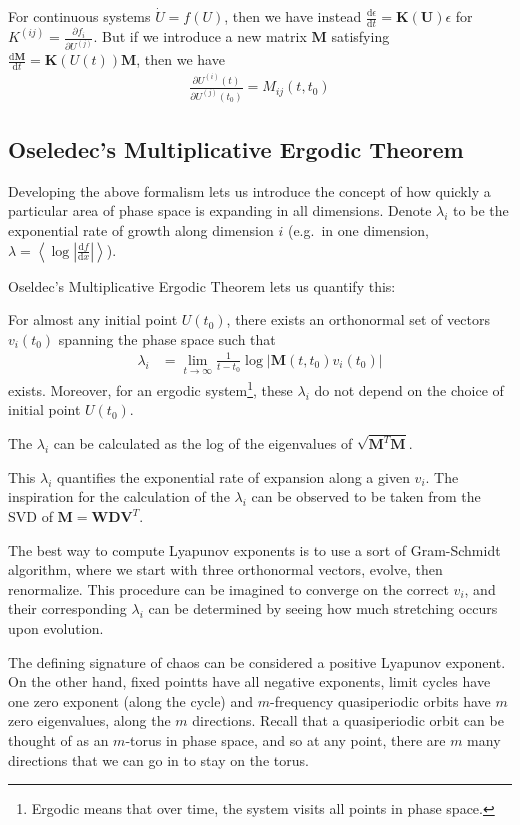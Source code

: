 \documentclass[12pt]{article}
\newcommand{\rd}[2]{\frac{\mathrm{d}#1}{\mathrm{d}#2}}
\newcommand{\pd}[2]{\frac{\partial#1}{\partial#2}}
\newcommand{\abs}[1]{\left|#1\right|}
\newcommand{\expvalue}[1]{\left<#1\right>}
\begin{document}
For continuous systems $\dot{U} = f(U)$, then we have instead $\rd{\epsilon}{t}
= \mathbf{K(U)}\epsilon$ for $K^{(ij)} = \pd{f_i}{U^{(j)}}$. But if we introduce
a new matrix $\mathbf{M}$ satisfying
$\rd{\mathbf{M}}{t} = \mathbf{K}(U(t))\mathbf{M}$, then we have
\begin{align}
    \pd{U^{(i)}(t)}{U^{(j)}(t_0)} = M_{ij}(t,t_0)
\end{align}

\subsection{Oseledec's Multiplicative Ergodic Theorem}

Developing the above formalism lets us introduce the concept of how quickly a
particular area of phase space is expanding in all dimensions. Denote
$\lambda_i$ to be the exponential rate of growth along dimension $i$ (e.g.\ in
one dimension, $\lambda = \expvalue{\log\abs{\rd{f}{x}}}$).

Oseldec's Multiplicative Ergodic Theorem lets us quantify this:
\begin{center}
    For almost any initial point $U(t_0)$, there exists an orthonormal set of
    vectors $v_i(t_0)$ spanning the phase space such that
    \begin{align}
        \lambda_i &= \lim_{t \to\infty} \frac{1}{t-t_0}
            \log\abs{\mathbf{M}(t, t_0) v_i(t_0)}
    \end{align}
    exists. Moreover, for an ergodic system\footnote{Ergodic means that over
    time, the system visits all points in phase space.}, these $\lambda_i$ do
    not depend on the choice of initial point $U(t_0)$.

    The $\lambda_i$ can be calculated as the log of the eigenvalues of
    $\sqrt{\mathbf{M}^T\mathbf{M}}$.
\end{center}

This $\lambda_i$ quantifies the exponential rate of expansion along a given
$v_i$. The inspiration for the calculation of the $\lambda_i$ can be observed to
be taken from the SVD of $\mathbf{M} = \mathbf{WDV}^T$.

The best way to compute Lyapunov exponents is to use a sort of Gram-Schmidt
algorithm, where we start with three orthonormal vectors, evolve, then
renormalize. This procedure can be imagined to converge on the correct $v_i$,
and their corresponding $\lambda_i$ can be determined by seeing how much
stretching occurs upon evolution.

The defining signature of chaos can be considered a positive Lyapunov
exponent. On the other hand, fixed pointts have all negative exponents, limit
cycles have one zero exponent (along the cycle) and $m$-frequency quasiperiodic
orbits have $m$ zero eigenvalues, along the $m$ directions. Recall that a
quasiperiodic orbit can be thought of as an $m$-torus in phase space, and so at
any point, there are $m$ many directions that we can go in to stay on the torus.
\end{document}
